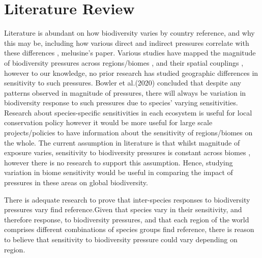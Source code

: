 \documentclass[11pt, a4paper, titlepage]{article}
\begin{document}
   	\section*{Literature Review}
   	Literature is abundant on how biodiversity varies by country {reference}, and why this may be, including how various direct and indirect pressures correlate with these differences \cite{sunday2015species}, \cite{ament2019compatibility} {melusine's paper}. 
	Various studies have mapped the magnitude of biodiversity pressures across regions/biomes \newline \cite{millennium2005ecosystems} \cite{sala2000global}, and their spatial couplings \cite{bowler2020mapping}, however to our knowledge, no prior research has studied geographic differences in sensitivity to such pressures. Bowler et al.(2020) concluded that despite any patterns observed in magnitude of pressures, there will always be variation in biodiversity response to such pressures due to species' varying sensitivities. Research about species-specific sensitivities in each ecosystem is useful for local conservation policy however it would be more useful for large scale projects/policies to have information about the sensitivity of regions/biomes on the whole. The current assumption in literature is that whilst magnitude of exposure varies, sensitivity to biodiversity pressures is constant across biomes \cite{sala2000global}, however there is no research to support this assumption. Hence, studying variation in biome sensitivity would be useful in comparing the impact of pressures in these areas on global biodiversity.  \newline
	
	There is adequate research to prove that inter-species responses to biodiversity pressures vary {find reference}.Given that species vary in their sensitivity, and therefore response, to biodiversity pressures, and that each region of the world comprises different combinations of species groups {find reference}, there is reason to believe that sensitivity to biodiversity pressure could vary depending on region. \newline
	
\end{document}
